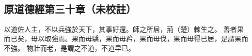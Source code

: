 ﻿%
%

\chapter{~}

\section{原道德經第三十章（未校註）}

\begin{withgezhu}

\zhsong


以道佐人主，不以兵強於天下，其事好還。\textcolor{tongjia-color}{師之所居}，荊（\textcolor{tongjia-color}{楚}）棘生之。
\textcolor{tongjia-color}{善者果而已矣，毋以取強焉。果而毋驕，果而毋矜，果而毋伐，果而毋得已居，是謂果而不強。}
\textcolor{tongjia-color}{物壯而老，是謂之不道，不道早已。}

\end{withgezhu}
